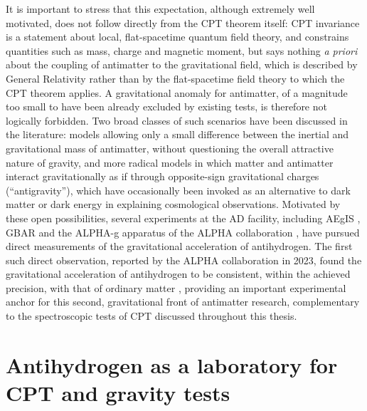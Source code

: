 It is important to stress that this expectation, although extremely well motivated, does not follow directly from the CPT theorem itself: CPT invariance is a statement about local, flat-spacetime quantum field theory, and constrains quantities such as mass, charge and magnetic moment, but says nothing \emph{a priori} about the coupling of antimatter to the gravitational field, which is described by General Relativity rather than by the flat-spacetime field theory to which the CPT theorem applies. A gravitational anomaly for antimatter, of a magnitude too small to have been already excluded by existing tests, is therefore not logically forbidden. Two broad classes of such scenarios have been discussed in the literature: models allowing only a small difference between the inertial and gravitational mass of antimatter, without questioning the overall attractive nature of gravity, and more radical models in which matter and antimatter interact gravitationally as if through opposite-sign gravitational charges (``antigravity''), which have occasionally been invoked as an alternative to dark matter or dark energy in explaining cosmological observations. Motivated by these open possibilities, several experiments at the AD facility, including AEgIS \cite{Aegisproposal}, GBAR \cite{GBAR:2011fij} and the ALPHA-g apparatus of the ALPHA collaboration \cite{ALPHA:2013skd}, have pursued direct measurements of the gravitational acceleration of antihydrogen. The first such direct observation, reported by the ALPHA collaboration in 2023, found the gravitational acceleration of antihydrogen to be consistent, within the achieved precision, with that of ordinary matter \cite{Anderson:2023wnq}, providing an important experimental anchor for this second, gravitational front of antimatter research, complementary to the spectroscopic tests of CPT discussed throughout this thesis.

\section{Antihydrogen as a laboratory for CPT and gravity tests}

